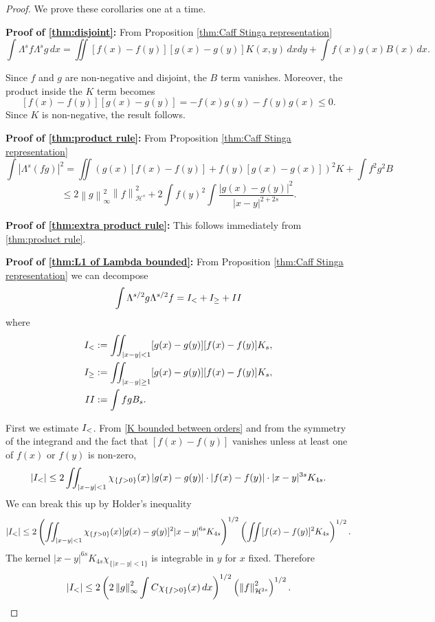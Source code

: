 \documentclass[11pt]{amsart}
\theoremstyle{remark}
\theoremstyle{definition}
\newcommand{\norm}[1]{\left\lVert#1\right\rVert}
\newcommand{\paren}[1]{\left( #1 \right)}
\newcommand{\abs}[1]{\left\lvert #1 \right\rvert}
\newcommand{\indic}[1]{\chi_{\{#1\}}}
\newcommand{\HD}{\mathcal{H}}
\newcommand{\Rom}[1]{\MakeUppercase{\romannumeral #1}}
\begin{document}
\begin{proof}
We prove these corollaries one at a time.  

\textbf{Proof of \eqref{thm:disjoint}:}
From Proposition \ref{thm:Caff Stinga representation}
\[ \int \Lambda^s f \Lambda^s g \,dx = \iint [f(x)-f(y)][g(x)-g(y)] K(x,y) \,dxdy + \int f(x) g(x) B(x) \,dx. \]

Since $f$ and $g$ are non-negative and disjoint, the $B$ term vanishes.  Moreover, the product inside the $K$ term becomes
\[ [f(x)-f(y)][g(x)-g(y)] = -f(x)g(y)-f(y)g(x) \leq 0. \]
Since $K$ is non-negative, the result follows.  

\textbf{Proof of \eqref{thm:product rule}:}
From Proposition \ref{thm:Caff Stinga representation}
\[ \int |\Lambda^s (fg)|^2 = \iint \paren{g(x)[f(x)-f(y)] + f(y)[g(x)-g(x)]}^2 K + \int f^2 g^2 B \]
\[ \leq 2 \norm{g}_\infty^2 \norm{f}_{\HD^s}^2 + 2 \int f(y)^2 \int \frac{|g(x)-g(y)|^2}{|x-y|^{2+2s}}. \]

\textbf{Proof of \eqref{thm:extra product rule}:}
This follows immediately from \eqref{thm:product rule}.  

\textbf{Proof of \eqref{thm:L1 of Lambda bounded}:}
From Proposition \ref{thm:Caff Stinga representation} we can decompose
\[ \int \Lambda^{s/2} g \Lambda^{s/2} f = \Rom{1}_< + \Rom{1}_\geq + \Rom{2} \]
where
\begin{align*} 
\Rom{1}_< &:= \iint_{|x-y| < 1} [g(x)-g(y)][f(x)-f(y)] K_s, \\
\Rom{1}_\geq &:= \iint_{|x-y|\geq 1} [g(x)-g(y)][f(x)-f(y)] K_s, \\
\Rom{2} &:= \int f g B_s. 
\end{align*}

First we estimate $\Rom{1}_<$.  From \eqref{K bounded between orders} and from the symmetry of the integrand and the fact that $[f(x)-f(y)]$ vanishes unless at least one of $f(x)$ or $f(y)$ is non-zero,
\[ \abs{\Rom{1}_<} \leq 2 \iint_{|x-y| < 1} \indic{f > 0}(x) \abs{g(x)-g(y)} \cdot \abs{f(x)-f(y)} \cdot |x-y|^{3s} K_{4s}. \]
We can break this up by Holder's inequality
\[ \abs{\Rom{1}_<} \leq 2 \paren{\iint_{|x-y| < 1} \indic{f > 0}(x) [g(x)-g(y)]^2 |x-y|^{6s} K_{4s} }^{1/2} \paren{\iint [f(x)-f(y)]^2 K_{4s} }^{1/2}. \]
The kernel $|x-y|^{6s} K_{4s} \indic{|x-y| < 1}$ is integrable in $y$ for $x$ fixed.  Therefore
\begin{equation} \label{K near of L1 less than L2 stuff} \abs{\Rom{1}_<} \leq 2 \paren{ 2\norm{g}_\infty^2 \int C \indic{f > 0}(x) \,dx }^{1/2} \paren{ \norm{f}_{\HD^{2s}}^2}^{1/2}. \end{equation}


\end{proof}
\end{document}
